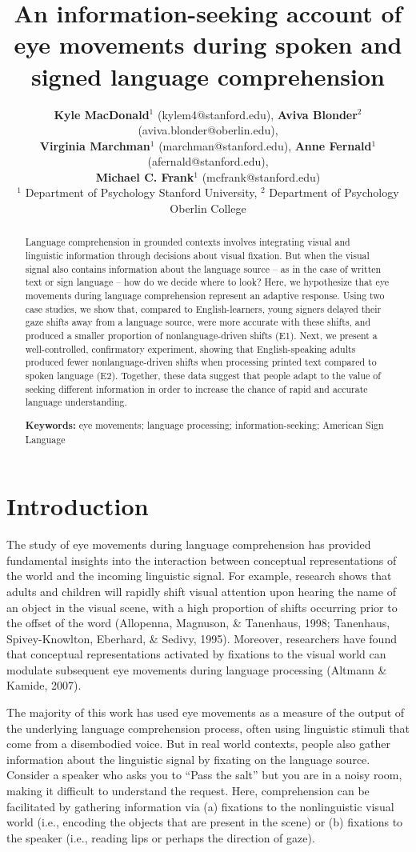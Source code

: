 \documentclass[10pt, letterpaper]{article}
\title{An information-seeking account of eye movements during spoken and signed
language comprehension}
\author{ {\large \bf Kyle MacDonald}$^1$ (kylem4@stanford.edu), {\large \bf Aviva Blonder}$^2$ (aviva.blonder@oberlin.edu), \\  {\large \bf Virginia Marchman}$^1$ (marchman@stanford.edu), {\large \bf Anne Fernald}$^1$ (afernald@stanford.edu), \\ {\large \bf Michael C. Frank}$^1$ (mcfrank@stanford.edu)  \\
   $^1$ Department of Psychology Stanford University, $^2$ Department of Psychology Oberlin College}
\begin{document}
\maketitle

\begin{abstract}
Language comprehension in grounded contexts involves integrating visual
and linguistic information through decisions about visual fixation. But
when the visual signal also contains information about the language
source -- as in the case of written text or sign language -- how do we
decide where to look? Here, we hypothesize that eye movements during
language comprehension represent an adaptive response. Using two case
studies, we show that, compared to English-learners, young signers
delayed their gaze shifts away from a language source, were more
accurate with these shifts, and produced a smaller proportion of
nonlanguage-driven shifts (E1). Next, we present a well-controlled,
confirmatory experiment, showing that English-speaking adults produced
fewer nonlanguage-driven shifts when processing printed text compared to
spoken language (E2). Together, these data suggest that people adapt to
the value of seeking different information in order to increase the
chance of rapid and accurate language understanding.

\textbf{Keywords:}
eye movements; language processing; information-seeking; American Sign
Language
\end{abstract}

\section{Introduction}\label{introduction}

The study of eye movements during language comprehension has provided
fundamental insights into the interaction between conceptual
representations of the world and the incoming linguistic signal. For
example, research shows that adults and children will rapidly shift
visual attention upon hearing the name of an object in the visual scene,
with a high proportion of shifts occurring prior to the offset of the
word (Allopenna, Magnuson, \& Tanenhaus, 1998; Tanenhaus,
Spivey-Knowlton, Eberhard, \& Sedivy, 1995). Moreover, researchers have
found that conceptual representations activated by fixations to the
visual world can modulate subsequent eye movements during language
processing (Altmann \& Kamide, 2007).

The majority of this work has used eye movements as a measure of the
output of the underlying language comprehension process, often using
linguistic stimuli that come from a disembodied voice. But in real world
contexts, people also gather information about the linguistic signal by
fixating on the language source. Consider a speaker who asks you to
``Pass the salt'' but you are in a noisy room, making it difficult to
understand the request. Here, comprehension can be facilitated by
gathering information via (a) fixations to the nonlinguistic visual
world (i.e., encoding the objects that are present in the scene) or (b)
fixations to the speaker (i.e., reading lips or perhaps the direction of
gaze).
\end{document}
